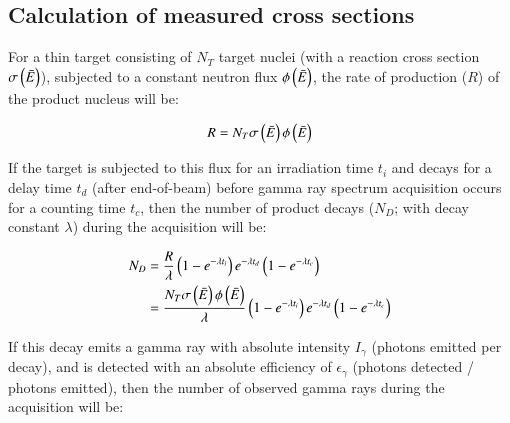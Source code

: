 



\subsection{Calculation of measured cross sections}\label{sec:calcs_sec_np}


For a thin target consisting of \(N_T\) target nuclei (with a reaction cross section $\sigma\left( \bar{E}\right)$), subjected to a constant neutron flux $\phi\left( \bar{E}\right)$, the rate of production ($R$) of the product nucleus will be:

\begin{equation}
R = N_T \sigma\left( \bar{E}\right) \phi\left( \bar{E}\right) 
\end{equation}

If the target is subjected to this flux  for an irradiation  time $t_i$ and decays for a  delay time $t_d$ (after end-of-beam) before gamma ray spectrum acquisition occurs for a counting time  $t_c$, then the number of product decays ($N_D$; with decay constant $\lambda$) during the acquisition will be:


\begin{align}
N_D &= \dfrac{R}{\lambda}\left( 1 - e^{-\lambda t_i}\right) e^{-\lambda t_d} \left( 1 - e^{-\lambda t_c}\right)
\\
&= \dfrac{N_T \sigma\left( \bar{E}\right) \phi\left( \bar{E}\right) }{\lambda}\left( 1 - e^{-\lambda t_i}\right) e^{-\lambda t_d} \left( 1 - e^{-\lambda t_c}\right) \nonumber
\end{align}


If this decay emits a gamma ray with absolute intensity $I_\gamma$ (photons emitted per decay), and is detected with an absolute efficiency  of $\epsilon_\gamma$ (photons detected / photons emitted), then the number of observed gamma rays during the acquisition will be:


